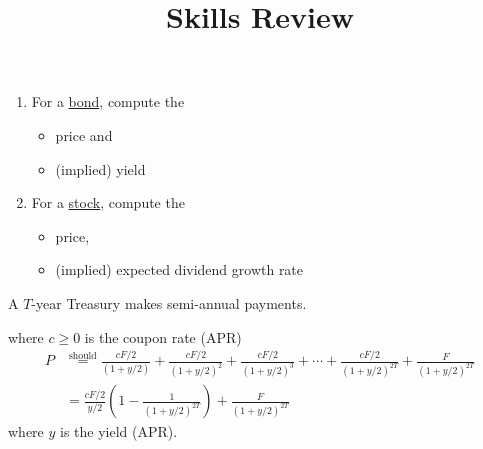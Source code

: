 \documentclass{beamer}
\title{Skills Review}
\newcommand{\should}{\overset{\text{should}}{=}}
\begin{document}
\begin{frame}{}
	\begin{enumerate}
		\item For a \underline{bond}, compute the
			\begin{itemize}
				\item price and 
				\item (implied) yield
			\end{itemize}
		\item For a \underline{stock}, compute the
			\begin{itemize}
				\item price,
				\item (implied) expected dividend growth rate
			\end{itemize}
	\end{enumerate}
\end{frame}


\begin{frame}{}
	A $T$-year Treasury makes semi-annual payments.
	\begin{figure}[H]
		\begin{center}
		\end{center}
	\end{figure}
where $c\geq0$ is the coupon rate (APR) 
{\scriptsize
\begin{align*}
	P&\should\frac{cF/2}{(1+y/2)}+\frac{cF/2}{(1+y/2)^2}+\frac{cF/2}{(1+y/2)^3}+\cdots+\frac{cF/2}{(1+y/2)^{2T}}+\frac{F}{(1+y/2)^{2T}}\\
	&=\frac{cF/2}{y/2}\left(1-\frac{1}{(1+y/2)^{2T}}\right)+\frac{F}{(1+y/2)^{2T}}
\end{align*}}
where $y$ is the yield (APR). 
\end{frame}
\end{document}
